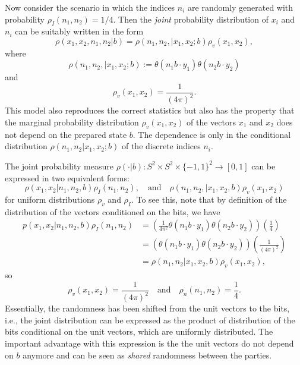 \documentclass[12pt,draft]{article}
\theoremstyle{definition}
\theoremstyle{plain}
\begin{document}
    Now consider the scenario in which the indices $n_i$ are
    randomly generated with probability $\rho_I(n_1,n_2) = 1
    / 4$. Then the \textit{joint} probability distribution
    of $x_i$ and $n_i$ can be suitably written in the
    form
    \begin{equation}
        \rho(x_1, x_2, n_1, n_2 | b)
        = \rho(n_1, n_2, | x_1, x_2; b)
        \rho_v(x_1, x_2),
    \end{equation}
    where
    \begin{equation}
        \rho(n_1, n_2, | x_1, x_2; b)
        := \theta(n_1 b \cdot y_1) \theta(n_2 
        b \cdot y_2)
    \end{equation}
    and
    \begin{equation}
        \rho_v(x_1, x_2)
        = \frac{1}{(4\pi)^2}.
    \end{equation}
    This model also reproduces the correct statistics but
    also has the property that the marginal probability
    distribution $\rho_v(x_1, x_2)$ of the vectors
    $x_1$ and $x_2$ does not depend on the
    prepared state $b$. The dependence is only in the
    conditional distribution $\rho(n_1,n_2 | x_1, 
    x_2; b)$ of the discrete indices $n_i$.

    {
        \color{red}
        The joint probability measure $\rho(\cdot|b) : S^2
        \times S^2 \times \{-1,1\}^2 \to [0,1]$ can be
        expressed in two equivalent forms:
        \begin{equation}
            \rho(x_1,x_2|n_1,n_2,b)\rho_I(n_1,n_2),
            \quad\text{and}\quad
            \rho(n_1,n_2,|x_1,x_2,b)\rho_v(x_1,x_2)
        \end{equation}
        for uniform distributions $\rho_v$ and $\rho_I$.
        To see this, note that by definition of the
        distribution of the vectors conditioned on the bits,
        we have
        \begin{align}
            p(x_1,x_2|n_1,n_2,b) \rho_I(n_1,n_2)
            &= \left(
                \frac{1}{4\pi^2} 
            \theta(n_1 b \cdot y_1)\theta(n_2 b \cdot y_2) 
            \right) \left( \frac{1}{4} \right) \\
            &= \left( \theta(n_1 b \cdot y_1)\theta(n_2 b \cdot
            y_2)\right) \left( 
                \frac{1}{(4\pi)^2}
            \right) \\
            &= \rho(n_1,n_2|x_1,x_2,b) \rho_v(x_1,x_2),
        \end{align}
        so
        \begin{equation}
            \rho_v(x_1,x_2)
            = \frac{1}{(4\pi)^2}
            \quad\text{and}\quad
            \rho_n(n_1,n_2)
            = \frac{1}{4}.
        \end{equation}
        Essentially, the randomness has been shifted from
        the unit vectors to the bits, i.e., the joint
        distribution can be expressed as the product of
        distribution of the bits conditional on the unit
        vectors, which are uniformly distributed. The
        important advantage with this expression is the the
        unit vectors do not depend on $b$ anymore and can
        be seen as \textit{shared} randomness between the
        parties.
    }
\end{document}
